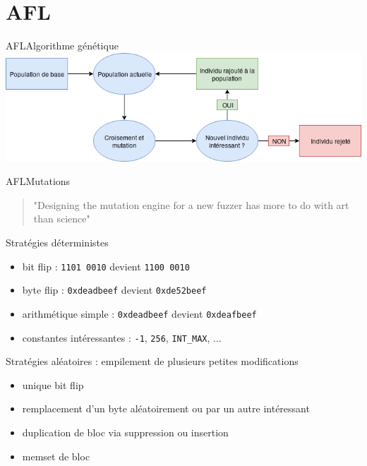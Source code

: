 \section{AFL}

\begin{frame}{AFL}{Algorithme génétique}
  \includegraphics[width=\textwidth]{../medias/genetique.png}
\end{frame}

\begin{frame}{AFL}{Mutations}
  \begin{quote}\Large
  "Designing the mutation engine for a new fuzzer has more to do with art than science"
  \end{quote}
  \begin{exampleblock}{Stratégies déterministes}
    \begin{itemize}
      \item{bit flip : \lstinline{1101 0010} devient \lstinline{1100 0010}} \pause
      \item{byte flip : \lstinline{0xdeadbeef} devient \lstinline{0xde52beef}} \pause
      \item{arithmétique simple : \lstinline{0xdeadbeef} devient \lstinline{0xdeafbeef}} \pause
      \item{constantes intéressantes : \lstinline{-1}, \lstinline{256}, \lstinline{INT_MAX}, ...} \pause
    \end{itemize}
  \end{exampleblock}
  \begin{exampleblock}{Stratégies aléatoires : empilement de plusieurs petites modifications}
    \begin{itemize}
      \item{unique bit flip} 
      \item{remplacement d'un byte aléatoirement ou par un autre intéressant} 
      \item{duplication de bloc via suppression ou insertion} 
      \item{memset de bloc}
    \end{itemize}
  \end{exampleblock}
\end{frame}

